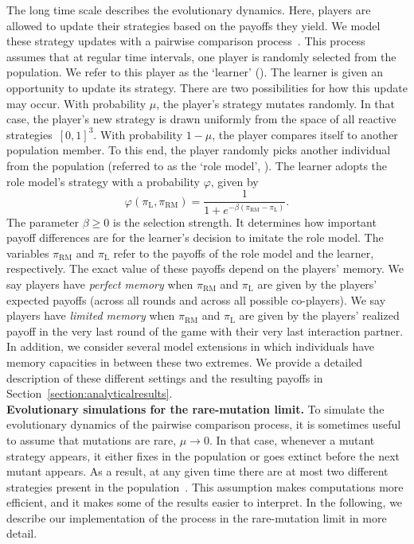 \documentclass[11pt]{article}
\def\rolemodel{\text{RM}}
\def\learner{\text{L}}
\theoremstyle{plainCl1}
\theoremstyle{plainCl2}
\begin{document}
The long time scale describes the evolutionary dynamics. 
Here, players are allowed to update their strategies based on the payoffs they yield. 
We model these strategy updates with a pairwise comparison process~\citep{traulsen2007pairwise}.
This process assumes that at regular time intervals, one player is randomly selected from the population.
We refer to this player as the `learner' (\learner). 
The learner is given an opportunity to update its strategy. 
There are two possibilities for how this update may occur. 
With probability $\mu$, the player's strategy mutates randomly. 
In that case, the player's new strategy is drawn uniformly from the space of all reactive strategies~$[0,1]^3$.  
With probability $1\!-\!\mu$, the player compares itself to another population member. 
To this end, the player randomly picks another individual from the population (referred to as the `role model', \rolemodel). 
The learner adopts the role model's strategy with a probability \(\varphi\), given by
\begin{equation} \label{Eq:rho}
    \varphi(\pi_{\learner}, \pi_{\rolemodel}) = \frac{1}{1\!+\! e^{-\!\beta (\pi_\rolemodel - \pi_\learner)}}.
\end{equation}
The parameter \(\beta\!\ge\!0\) is the selection strength.
It determines how important payoff differences are for the learner's decision to imitate the role model. 
The variables $\pi_\rolemodel$ and $\pi_\learner$ refer to the payoffs of the role model and the learner, respectively. 
The exact value of these payoffs depend on the players' memory. 
We say players have {\it perfect memory} when $\pi_\rolemodel$ and $\pi_\learner$ are given by the players' expected payoffs (across all rounds and across all possible co-players). 
We say players have {\it limited memory} when $\pi_\rolemodel$ and $\pi_\learner$ are given by the players' realized payoff in the very last round of the game with their very last interaction partner. 
In addition, we consider several model extensions in which individuals have memory capacities in between these two extremes. 
We provide a detailed description of these different settings and the resulting payoffs in Section~\ref{section:analyticalresults}.\\


\noindent
{\bf Evolutionary simulations for the rare-mutation limit.} 
To simulate the evolutionary dynamics of the pairwise comparison process, it is sometimes useful to assume that mutations are rare, $\mu\!\rightarrow\!0$. 
In that case, whenever a mutant strategy appears, it either fixes in the population or goes extinct before the next mutant appears. 
As a result, at any given time there are at most two different strategies present in the population~\citep{fudenberg:JET:2006,wu:JMB:2012,mcavoy:jet:2015}. 
This assumption makes computations more efficient, and it makes some of the results easier to interpret.
In the following, we describe our implementation of the process in the rare-mutation limit in more detail. 
\end{document}
